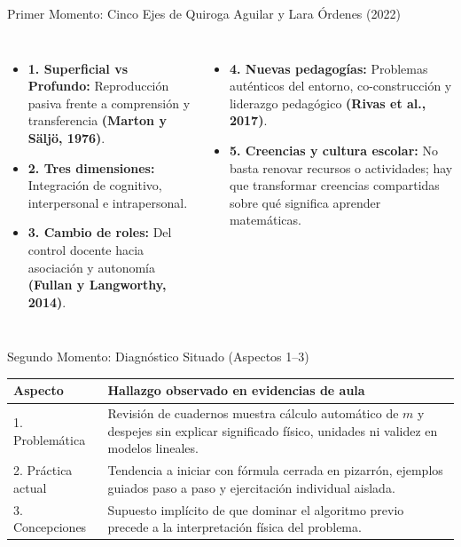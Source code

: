 \documentclass[aspectratio=169,spanish,xcolor=table]{beamer}
\begin{document}
\begin{frame}{Primer Momento: Cinco Ejes de Quiroga Aguilar y Lara Órdenes (2022)}
  \begin{columns}[T]
      \begin{itemize}\scriptsize
        \item \textbf{1. Superficial vs Profundo:} Reproducción pasiva frente a comprensión y transferencia \textbf{(Marton y Säljö, 1976)}.
        \item \textbf{2. Tres dimensiones:} Integración de cognitivo, interpersonal e intrapersonal.
        \item \textbf{3. Cambio de roles:} Del control docente hacia asociación y autonomía \textbf{(Fullan y Langworthy, 2014)}.
      \end{itemize}
      \begin{itemize}\scriptsize
        \item \textbf{4. Nuevas pedagogías:} Problemas auténticos del entorno, co-construcción y liderazgo pedagógico \textbf{(Rivas et al., 2017)}.
        \item \textbf{5. Creencias y cultura escolar:} No basta renovar recursos o actividades; hay que transformar creencias compartidas sobre qué significa aprender matemáticas.
      \end{itemize}
  \end{columns}
\end{frame}

\begin{frame}{Segundo Momento: Diagnóstico Situado (Aspectos 1--3)}
  \scriptsize\renewcommand{\arraystretch}{1.35}
  \begin{tabular}{p{2.7cm}p{10.3cm}}
    \toprule
    \rowcolor{iiiepePale} \textbf{Aspecto} & \textbf{Hallazgo observado en evidencias de aula} \\
    \midrule
    1. Problemática & Revisión de cuadernos muestra cálculo automático de $m$ y despejes sin explicar significado físico, unidades ni validez en modelos lineales. \\
    2. Práctica actual & Tendencia a iniciar con fórmula cerrada en pizarrón, ejemplos guiados paso a paso y ejercitación individual aislada. \\
    3. Concepciones & Supuesto implícito de que dominar el algoritmo previo precede a la interpretación física del problema. \\
    \bottomrule
  \end{tabular}
\end{frame}
\end{document}
